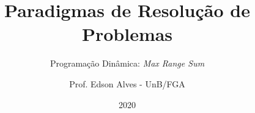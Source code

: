 \title{Paradigmas de Resolução de Problemas}
\subtitle{Programação Dinâmica: {\it Max Range Sum}}
\author{Prof. Edson Alves - UnB/FGA}
\date{2020}
